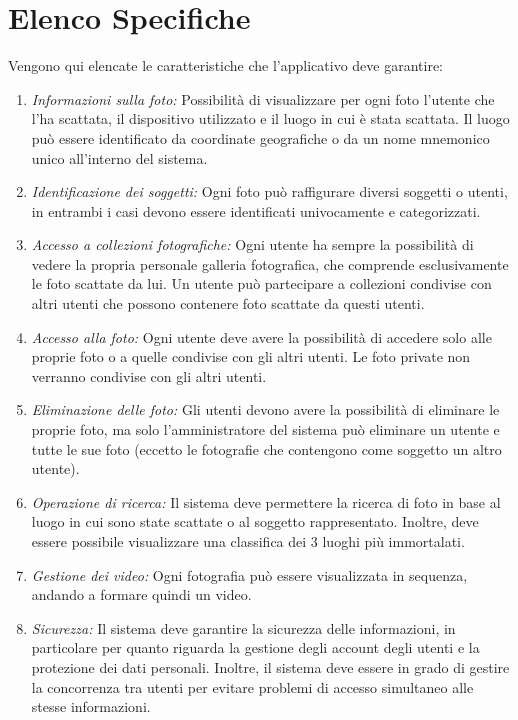 \documentclass[a4paper,12pt,oneside]{book}
\begin{document}
    \section{Elenco Specifiche}
   Vengono qui elencate le caratteristiche che l'applicativo deve garantire:
    \begin{enumerate}
        \item \emph{Informazioni sulla foto:} Possibilità di visualizzare per ogni foto l'utente che l'ha scattata, il dispositivo utilizzato e il luogo in cui è stata scattata. Il luogo può essere identificato da coordinate geografiche o da un nome mnemonico unico all'interno del sistema.
        
        \item \emph{Identificazione dei soggetti:} Ogni foto può raffigurare diversi soggetti o utenti, in entrambi i casi devono essere identificati univocamente e categorizzati.

        \item \emph{Accesso a collezioni fotografiche:} Ogni utente ha sempre la possibilità di vedere la propria personale galleria fotografica, che comprende esclusivamente le foto scattate da lui. Un utente può partecipare a collezioni condivise con altri utenti che possono contenere foto scattate da questi utenti. 
        
         \item \emph{Accesso alla foto:} Ogni utente deve avere la possibilità di accedere solo alle proprie foto o a quelle condivise con gli altri utenti. Le foto private non verranno condivise con gli altri utenti.
         
        \item \emph{Eliminazione delle foto:} Gli utenti devono avere la possibilità di eliminare le proprie foto, ma solo l'amministratore del sistema può eliminare un utente e tutte le sue foto (eccetto le fotografie che contengono come soggetto un altro utente).

        \item \emph{Operazione di ricerca:} Il sistema deve permettere la ricerca di foto in base al luogo in cui sono state scattate o al soggetto rappresentato. Inoltre, deve essere possibile visualizzare una classifica dei 3 luoghi più immortalati.
        \item \emph{Gestione dei video:} Ogni fotografia può essere visualizzata in sequenza, andando a formare quindi un video.

        \item \emph{Sicurezza:} Il sistema deve garantire la sicurezza delle informazioni, in particolare per quanto riguarda la gestione degli account degli utenti e la protezione dei dati personali. Inoltre, il sistema deve essere in grado di gestire la concorrenza tra utenti per evitare problemi di accesso simultaneo alle stesse informazioni.
    \end{enumerate}
    \par
    
\end{document}
